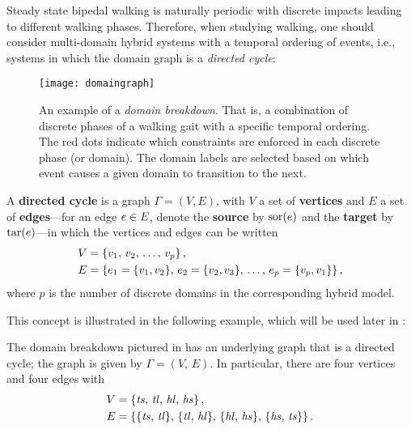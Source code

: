 Steady state bipedal walking is naturally periodic with discrete impacts leading
to different walking phases.
%
Therefore, when studying walking, one should consider multi-domain hybrid
systems with a temporal ordering of events, i.e., systems in which the domain
graph is a {\em directed cycle}:

\begin{figure}[t]
  \centering
  \texttt{[image: domaingraph]}
  \caption[An example of a {\em domain breakdown}.]{An example of a {\em domain
      breakdown}.
    That is, a combination of discrete phases of a walking gait with a specific
    temporal ordering. The red dots indicate which constraints are enforced in
    each discrete phase (or domain).
    The domain labels are selected based on which event causes a given domain to
    transition to the next.}
  \label{fig:domaingraph}
\end{figure}

\begin{definition}
  A {\bf directed cycle} is a graph $\Gamma = (V, E)$, with $V$ a set of {\bf
    vertices} and $E$ a set of {\bf edges}---for an edge $e \in E$, denote the
  {\bf source} by $\mathrm{sor}(e)$ and the {\bf target} by $\mathrm{tar}(e)$---in which the
  vertices and edges can be written
  \begin{align}
    \nonumber
    V &= \left\{v_{1}, \, v_{2}, \, \ldots, \, v_{p}\right\},\\
    \label{eq:directedcyclep}
    E &= \left\{e_{1} = \{v_{1}, v_{2}\}, \, e_{2} = \{v_{2}, v_{3}\}, \,
      \ldots, \, e_{p} = \{v_{p}, v_{1}\}\right\},
  \end{align}
  where $p$ is the number of discrete domains in the corresponding hybrid
  model.
\end{definition}

This concept is illustrated in the following example, which will be used later
in :

\begin{exmp} \label{universalgraph}
  The domain breakdown pictured in  has an underlying
  graph that is a directed cycle;
  the graph is given by $\Gamma = (V, \, E)$.
  In particular, there are four vertices and four edges with
  \begin{align*}
    V &= \left\{\mathit{ts}, \, \mathit{tl}, \, \mathit{hl}, \, \mathit{hs}\right\},\\
    E &= \left\{\{\mathit{ts}, \, \mathit{tl}\}, \, \{\mathit{tl}, \, \mathit{hl}\}, \, \{\mathit{hl}, \, \mathit{hs}\}, \,
      \{\mathit{hs}, \, \mathit{ts}\}\right\}.
  \end{align*}
\end{exmp}

